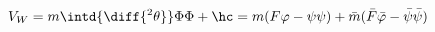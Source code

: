 \begin{equation}
\label{eq:introd2}
  V_W = m \intd{\diff{^2 \theta}} \Phi \Phi + \hc = m (F \varphi - \psi
  \psi) + \bar{m} ( \bar{F} \bar{\varphi} - \bar{\psi} \bar{\psi})
\end{equation}

